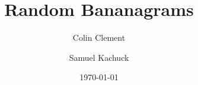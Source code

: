 \documentclass[twocolumn]{revtex4}
\begin{document}
\title{Random Bananagrams}

\author{Colin Clement}
\author{Samuel Kachuck}

\date{\today}

\begin{abstract}
\end{abstract}

\maketitle
\end{document}
